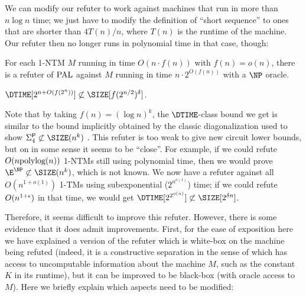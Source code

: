 We can modify our refuter to work against machines that run in more than $n \log n$ time; we just have to modify the
definition of ``short sequence'' to ones that are shorter than $4T(n)/n$, where $T(n)$ is the runtime of the machine.
Our refuter then no longer runs in polynomial time in that case, though: 

\begin{theorem}
    For each 1-NTM $M$ running in time $O(n \cdot f(n))$ with $f(n) = o(n)$, there is a refuter of $\mathrm{PAL}$ against $M$ running in time 
    $n \cdot 2^{O(f(n))}$ with a $\NP$ oracle.
\end{theorem}

\begin{corollary}
    $\DTIME[2^{n+O(f(2^n))}] \not\subset \SIZE[f(2^{n/2})^\delta]$.
\end{corollary}

Note that by taking $f(n) = (\log n)^k$, the $\DTIME$-class bound we get is similar to the bound implicitly obtained
by the classic diagonalization used to show $\Sigma^{\PTIME}_4 \not\subset \SIZE(n^k)$ \cite{Kannan82}. This refuter
is too weak to give new circuit lower bounds, but on in some sense it seems to be ``close''. For example, if we could 
refute $O(n \text{polylog}(n))$ 1-NTMs still using polynomial time, then we would prove $\E^\NP \not\subset \SIZE(n^k)$, 
which is not known. We now have a refuter against all $O(n^{1+o(1)})$ 1-TMs using subexponential ($2^{n^{o(1)}}$) time;
if we could refute $O(n^{1+\epsilon})$ in that time, we would get $\DTIME[2^{2^{o(n)}}] \not\subset \SIZE[2^{\delta n}]$.   

Therefore, it seems difficult to improve this refuter. However, there is some evidence that it does admit improvements.
First, for the ease of exposition here we have explained a version of the refuter which is white-box on the machine 
being refuted (indeed, it is a constructive separation in the sense of \cite{ConstructiveSeparations} which has access
to uncomputable information about the machine $M$, such as the constant $K$ in its runtime), but it can be improved 
to be black-box (with oracle access to $M$). Here we briefly explain which aspects need to be modified:

